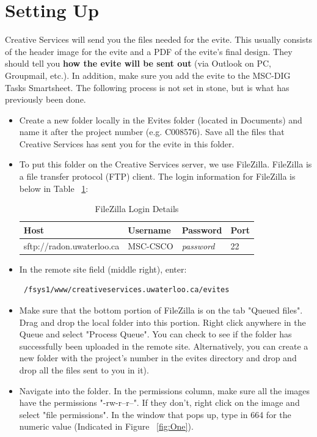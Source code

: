 \documentclass[a4paper,11pt]{article}
\begin{document}
	\section{Setting Up}
	Creative Services will send you the files needed for the evite. This usually consists of the header image for the evite and a PDF of the evite's final design. They should tell you \textbf{how the evite will be sent out} (via Outlook on PC, Groupmail, etc.). In addition, make sure you add the evite to the MSC-DIG Tasks Smartsheet. The following process is not set in stone, but is what has previously been done.
	\begin{itemize}
		\item[Step 1] Create a new folder locally in the Evites folder (located in Documents) and name it after the project number (e.g. C008576). Save all the files that Creative Services has sent you for the evite in this folder.
		\item[Step 2] To put this folder on the Creative Services server, we use FileZilla. FileZilla is a file transfer protocol (FTP) client. The login information for FileZilla is below in Table ~\ref{tab:log}: \par
			\begin{table}[htp]
			\begin{center}
			\label{tab:log}
			\caption{FileZilla Login Details}
			\begin{tabular}{| l | l | l | l |}
			\hline
			Host & Username & Password & Port \\ \hline
			sftp://radon.uwaterloo.ca & MSC-CSCO & \textit{password} & 22 \\ \hline
			\end{tabular}
			\end{center}
			\end{table}
		\item[Step 3] In the remote site field (middle right), enter: \begin{verbatim} /fsys1/www/creativeservices.uwaterloo.ca/evites \end{verbatim}
		\item[Step 4] Make sure that the bottom portion of FileZilla is on the tab "Queued files". Drag and drop the local folder into this portion. Right click anywhere in the Queue and select "Process Queue". You can check to see if the folder has successfully been uploaded in the remote site. Alternatively, you can create a new folder with the project's number in the evites directory and drop and drop all the files sent to you in it).
		\item[Step 5] Navigate into the folder. In the permissions column, make sure all the images have the permissions "-rw-r--r--". If they don't, right click on the image and select "file permissions". In the window that pops up, type in 664 for the numeric value (Indicated in Figure ~\ref{fig:One}).

\end{itemize}
\end{document}
